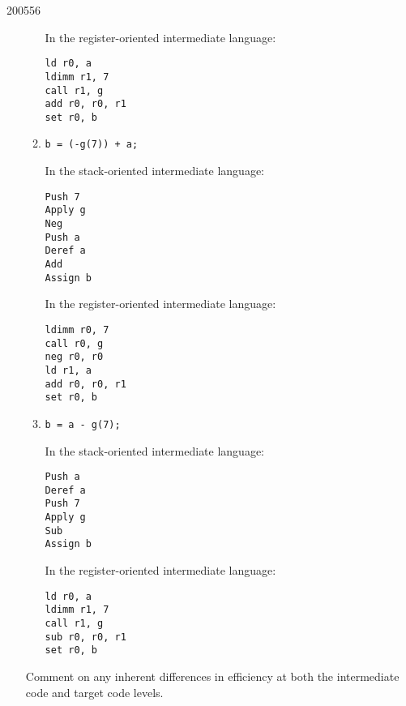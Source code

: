 \documentclass[10pt,\jkfside,a4paper]{article}
\begin{document}
\begin{examquestion}{2005}{5}{6}
\begin{enumerate}
\begin{enumerate}
In the register-oriented intermediate language:
\begin{lstlisting}
ld r0, a
ldimm r1, 7
call r1, g
add r0, r0, r1
set r0, b
\end{lstlisting}

\item \texttt{b = (-g(7)) + a;}

In the stack-oriented intermediate language:
\begin{lstlisting}
Push 7
Apply g
Neg
Push a
Deref a
Add
Assign b
\end{lstlisting}

In the register-oriented intermediate language:
\begin{lstlisting}
ldimm r0, 7
call r0, g
neg r0, r0
ld r1, a
add r0, r0, r1
set r0, b
\end{lstlisting}

\item \texttt{b = a - g(7);}

In the stack-oriented intermediate language:
\begin{lstlisting}
Push a
Deref a
Push 7
Apply g
Sub
Assign b
\end{lstlisting}

In the register-oriented intermediate language:
\begin{lstlisting}
ld r0, a
ldimm r1, 7
call r1, g
sub r0, r0, r1
set r0, b
\end{lstlisting}

\end{enumerate}

Comment on any inherent differences in efficiency at both the intermediate
code and target code levels.

\end{enumerate}

\end{examquestion}
\end{document}
